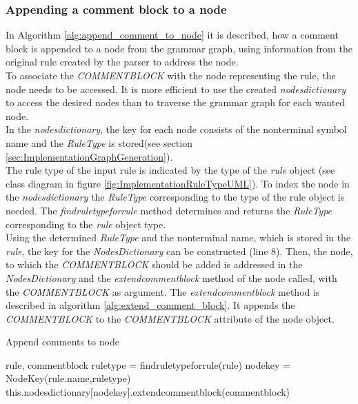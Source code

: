 \subsubsection{Appending a comment block to a node}\label{sec:ImplementationMaintainingCommentBlockWithNodes}

In Algorithm \ref{alg:append_comment_to_node} it is described, how a comment block is appended to a node from the grammar graph, using information from the original rule created by the parser to address the node.\\
To associate the \textit{COMMENT\textunderscore BLOCK} with the node representing the rule, the node needs to be accessed.
It is more efficient to use the created \textit{nodes\textunderscore dictionary} to access the desired nodes than to traverse the grammar graph for each wanted node.\\
In the \textit{nodes\textunderscore dictionary}, the key for each node consists of the nonterminal symbol name and the \textit{RuleType} is stored(see section \ref{sec:ImplementationGraphGeneration}).\\
The rule type of the input rule is indicated by the type of the \textit{rule} object (see class diagram in figure \ref{fig:ImplementationRuleTypeUML}).
To index the node in the \textit{nodes\textunderscore dictionary} the \textit{RuleType} corresponding to the type of the rule object is needed.
The \textit{find\textunderscore rule\textunderscore type\textunderscore for\textunderscore rule} method determines and returns the \textit{RuleType} corresponding to the \textit{rule} object type.\\
Using the determined \textit{RuleType} and the nonterminal name, which is stored in the \textit{rule}, the key for the \textit{Nodes\textunderscore Dictionary} can be constructed (line 8).
Then, the node, to which the \textit{COMMENT\textunderscore BLOCK} should be added is addressed in the \textit{Nodes\textunderscore Dictionary} and the \textit{extend\textunderscore comment\textunderscore block} method of the node called, with the \textit{COMMENT\textunderscore BLOCK} as argument.
The \textit{extend\textunderscore comment\textunderscore block} method is described in algorithm \ref{alg:extend_comment_block}.
It appends the \textit{COMMENT\textunderscore BLOCK} to the \textit{COMMENT\textunderscore BLOCK} attribute of the node object.

\begin{algorithm}[H]
\small
\caption{Append comments to node}
\begin{algorithmic}[1]
\algrenewcommand\algorithmicindent{0.4em}
\Require rule, comment\textunderscore block
\State rule\textunderscore type = find\textunderscore rule\textunderscore type\textunderscore for\textunderscore rule(rule)
\State node\textunderscore key = Node\textunderscore Key(rule.name,rule\textunderscore type)
\State this.nodes\textunderscore dictionary[node\textunderscore key].extend\textunderscore comment\textunderscore block(comment\textunderscore block)
\end{algorithmic}
\label{alg:append_comment_to_node}
\end{algorithm}

